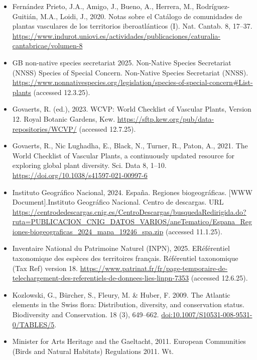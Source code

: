 \documentclass[
]{article}
\begin{document}
\begin{itemize}
  European Environment Agency (EEA), 2025b. Natura 2000 (tabular) -
  version end 2023
  \url{https://www.eea.europa.eu/en/datahub/datahubitem-view/6fc8ad2d-195d-40f4-bdec-576e7d1268e4}
\item
  Fernández Prieto, J.A., Amigo, J., Bueno, A., Herrera, M.,
  Rodríguez-Guitián, M.A., Loidi, J., 2020. Notas sobre el Catálogo de
  comunidades de plantas vasculares de los territorios iberoatlánticos
  (I). Nat. Cantab. 8, 17--37.
  \url{https://www.indurot.uniovi.es/actividades/publicaciones/caturalia-cantabricae/volumen-8}
\item
  GB non-native species secretariat 2025. Non-Native Species Secretariat
  (NNSS) Species of Special Concern. Non-Native Species Secretariat
  (NNSS).
  \url{https://www.nonnativespecies.org/legislation/species-of-special-concern\#List-plants}
  (accessed 12.3.25).
\item
  Govaerts, R. (ed.), 2023. WCVP: World Checklist of Vascular Plants,
  Version 12. Royal Botanic Gardens, Kew.
  \url{https://sftp.kew.org/pub/data-repositories/WCVP/} (accessed
  12.7.25).
\item
  Govaerts, R., Nic Lughadha, E., Black, N., Turner, R., Paton, A.,
  2021. The World Checklist of Vascular Plants, a continuously updated
  resource for exploring global plant diversity. Sci. Data 8, 1--10.
  \url{https://doi.org/10.1038/s41597-021-00997-6}
\item
  Instituto Geográfico Nacional, 2024. España. Regiones biogeográficas.
  {[}WWW Document{]}.Instituto Geográfico Nacional. Centro de descargas.
  URL
  \url{https://centrodedescargas.cnig.es/CentroDescargas/busquedaRedirigida.do?ruta=PUBLICACION_CNIG_DATOS_VARIOS/aneTematico/Espana_Regiones-biogeograficas_2024_mapa_19246_spa.zip}
  (accessed 11.1.25).
\item
  Inventaire National du Patrimoine Naturel (INPN), 2025. ERéférentiel
  taxonomique des espèces des territoires français. Référentiel
  taxonomique (Tax Ref) version 18.
  \url{https://www.patrinat.fr/fr/page-temporaire-de-telechargement-des-referentiels-de-donnees-lies-linpn-7353}
  (accessed 12.6.25).
\item
  Kozlowski, G., Bürcher, S., Fleury, M. \& Huber, F. 2009. The Atlantic
  elements in the Swiss flora: Distribution, diversity, and conservation
  status. Biodiversity and Conservation. 18 (3), 649--662.
  \url{doi:10.1007/S10531-008-9531-0/TABLES/5}.
\item
  Minister for Arts Heritage and the Gaeltacht, 2011. European
  Communities (Birds and Natural Habitats) Regulations 2011. Wt.

\end{itemize}
\end{document}
